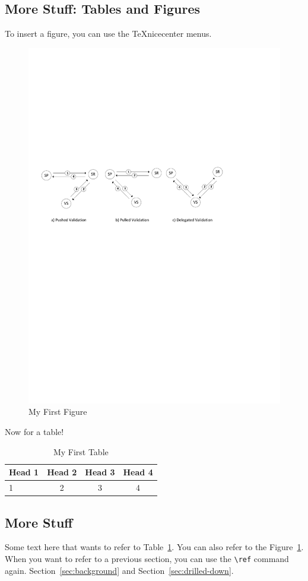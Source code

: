 \documentclass{article}
\begin{document}
\subsection{More Stuff: Tables and Figures}
To insert a figure, you can use the TeXnicecenter menus. 

\begin{figure}
	\centering
		\includegraphics[width=1.00\textwidth]{att-models-base.pdf}
	\caption{My First Figure}
	\label{fig:att-models-base}
\end{figure}

Now for a table! 

\begin{table}
	\centering
		\begin{tabular}{|l|c|c|c|}
		\hline 
		Head 1 & Head 2 & Head 3 & Head 4   \\\hline 
		1      &      2 & 3      & 4 \\			
		\hline
		\end{tabular}
	\caption{My First Table}
	\label{tab:MyFirstTable}
\end{table}

\subsection{More Stuff} 
Some text here that wants to refer to Table~\ref{tab:MyFirstTable}. You can also refer to the Figure~\ref{fig:att-models-base}. When you want to refer to a previous section, you can use the \verb|\ref| command again. Section~\ref{sec:background} and Section~\ref{sec:drilled-down}. 

 
\end{document}
